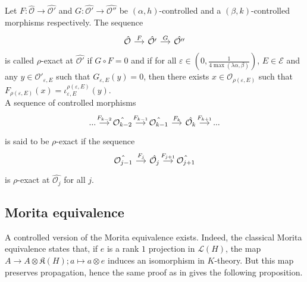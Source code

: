 \begin{definition}
Let $F : \hat{\mathcal O}\rightarrow \hat{\mathcal O'}$ and $G : \hat{\mathcal O'}\rightarrow \hat{\mathcal O''}$ be $(\alpha,h)$-controlled and a $(\beta,k)$-controlled morphisms respectively. The sequence
\[\begin{tikzcd}[column sep = small] \hat{\mathcal O} \arrow{r}{F} & \hat{\mathcal O'} \arrow{r}{G} & \hat{\mathcal O''} \end{tikzcd}\]
is called $\rho$-exact at $\hat{\mathcal O'}$ if $G\circ F=0$ and if for all $\varepsilon\in (0,\frac{1}{4 \max (\lambda \alpha,\beta)})$, $E\in\mathcal E$ and any $y\in \mathcal O'_{\varepsilon,E}$ such that $G_{\varepsilon,E}(y) = 0$, then there exists $x\in \mathcal O_{\rho(\varepsilon,E)}$ such that $F_{\rho(\varepsilon,E)}(x)=\iota_{\varepsilon,E}^{\rho(\varepsilon,E)} (y)$.\\
A sequence of controlled morphisms 
\[\begin{tikzcd}[column sep = small] ... \arrow{r}{F_{k-2}} & \hat{\mathcal O_{k-2}} \arrow{r}{F_{k-1}} & \hat{\mathcal O_{k-1}} \arrow{r}{F_k} & \hat{\mathcal O_k} \arrow{r}{F_{k+1}} & ... \end{tikzcd}\] 
is said to be $\rho$-exact if the sequence
\[\begin{tikzcd}[column sep = small] \hat{\mathcal O_{j-1}} \arrow{r}{F_{j}} & \hat{\mathcal O_{j}} \arrow{r}{F_{j+1}} & \hat{\mathcal O_{j+1}} \end{tikzcd}\]
is $\rho$-exact at $\hat{\mathcal O_j}$ for all $j$.
\end{definition}

\subsection{Morita equivalence}

A controlled version of the Morita equivalence exists. Indeed, the classical Morita equivalence states that, if $e$ is a rank $1$ projection in $\mathcal L (H)$, the map $A\rightarrow A\otimes \mathfrak K(H) ; a\mapsto a\otimes e$ induces an isomorphism in $K$-theory. But this map preserves propagation, hence the same proof as in \cite{OY2} gives the following proposition.


